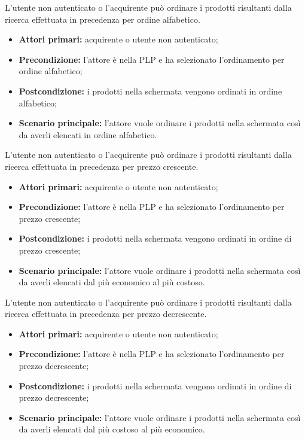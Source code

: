 
L'utente non autenticato o l'acquirente può ordinare i prodotti risultanti dalla ricerca effettuata in precedenza per ordine alfabetico.
\begin{itemize}
    \item \textbf{Attori primari:} acquirente o utente non autenticato;
    \item \textbf{Precondizione:} l'attore è nella PLP e ha selezionato l'ordinamento per ordine alfabetico;
    \item \textbf{Postcondizione:} i prodotti nella schermata vengono ordinati in ordine alfabetico;
    \item \textbf{Scenario principale:} l'attore vuole ordinare i prodotti nella schermata così da averli elencati in ordine alfabetico.
\end{itemize}


L'utente non autenticato o l'acquirente può ordinare i prodotti risultanti dalla ricerca effettuata in precedenza per prezzo crescente.
\begin{itemize}
    \item \textbf{Attori primari:} acquirente o utente non autenticato;
    \item \textbf{Precondizione:} l'attore è nella PLP e ha selezionato l'ordinamento per prezzo crescente;
    \item \textbf{Postcondizione:} i prodotti nella schermata vengono ordinati in ordine di prezzo crescente;
    \item \textbf{Scenario principale:} l'attore vuole ordinare i prodotti nella schermata così da averli elencati dal più economico al più costoso.
\end{itemize}


L'utente non autenticato o l'acquirente può ordinare i prodotti risultanti dalla ricerca effettuata in precedenza per prezzo decrescente.
\begin{itemize}
    \item \textbf{Attori primari:} acquirente o utente non autenticato;
    \item \textbf{Precondizione:} l'attore è nella PLP e ha selezionato l'ordinamento per prezzo decrescente;
    \item \textbf{Postcondizione:} i prodotti nella schermata vengono ordinati in ordine di prezzo decrescente;
    \item \textbf{Scenario principale:} l'attore vuole ordinare i prodotti nella schermata così da averli elencati dal più costoso al più economico.
\end{itemize}

